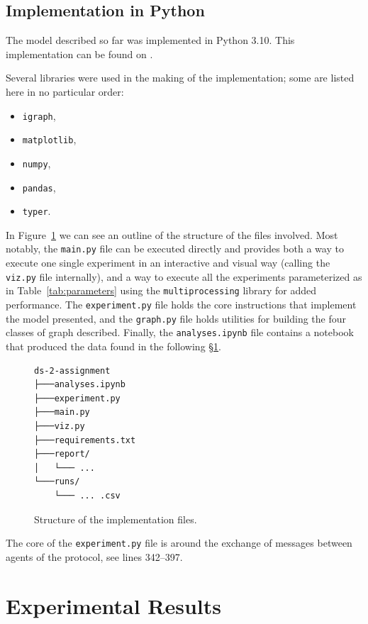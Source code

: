 \documentclass[a4paper]{ifacconf}
\begin{document}
\subsection{Implementation in Python}

The model described so far was implemented in Python 3.10.
This implementation can be found on \cite{implementation}.

Several libraries were used in the making of the implementation; some are listed here in no particular order:
\begin{itemize}
    \item \texttt{igraph},
    \item \texttt{matplotlib},
    \item \texttt{numpy},
    \item \texttt{pandas},
    \item \texttt{typer}.
\end{itemize}

In Figure~\ref{fig:structure} we can see an outline of the structure of the files involved.
Most notably, the \texttt{main.py} file can be executed directly and provides both a way to execute one single experiment in an interactive and visual way (calling the \texttt{viz.py} file internally), and a way to execute all the experiments parameterized as in Table~\ref{tab:parameters} using the \texttt{multiprocessing} library for added performance.
The \texttt{experiment.py} file holds the core instructions that implement the model presented, and the \texttt{graph.py} file holds utilities for building the four classes of graph described.
Finally, the \texttt{analyses.ipynb} file contains a notebook that produced the data found in the following \S\ref{sec:results}.

\begin{figure}
\centering\begin{verbatim}
ds-2-assignment
├───analyses.ipynb
├───experiment.py
├───main.py
├───viz.py
├───requirements.txt
├───report/
│   └─── ...
└───runs/
    └─── ... .csv
\end{verbatim}
    \caption{Structure of the implementation files.}
    \label{fig:structure}
\end{figure}

The core of the \texttt{experiment.py} file is around the exchange of messages between agents of the protocol, see lines 342--397.

\section{Experimental Results}\label{sec:results}
\end{document}
